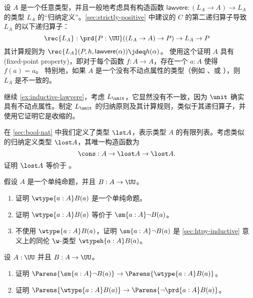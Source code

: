 \begin{ex}\label{ex:inductive-lawvere}
设 $A$ 是一个任意类型，并且一般地考虑具有构造函数 $\mathsf{lawvere}:(L_A\to A) \to L_A$ 的类型 $L_A$ 的“归纳定义”。\cref{sec:strictly-positive} 中建议的 $C$ 的第二递归算子导致 $L_A$ 的以下递归算子：
\[ \rec{L_A} : \prd{P:\UU} ((L_A\to A) \to P) \to L_A\to P \]
其计算规则为 $\rec{L_A}(P,h,\mathsf{lawvere}(\alpha)) \jdeq h(\alpha)$。
使用这个证明 $A$ 具有 (fixed-point property)，即对于每个函数 $f:A\to A$，存在一个 $a:A$ 使得 $f(a)=a$。
%
%
特别地，如果 $A$ 是一个没有不动点属性的类型（例如 \emptyt、\bool 或 \nat），则 $L_A$ 是不一致的。
\end{ex}

\begin{ex}\label{ex:ilunit}
继续 \cref{ex:inductive-lawvere}，考虑 $L_\unit$，它显然没有不一致，因为 $\unit$ 确实具有不动点属性。制定 $L_\unit$ 的归纳原则及其计算规则，类似于其递归算子，并使用它证明它是收缩的。
\end{ex}

\begin{ex}\label{ex:empty-inductive-type}
在 \cref{sec:bool-nat} 中我们定义了类型 $\lst A$，表示类型 $A$ 的有限列表。考虑类似的归纳定义类型 $\lost A$，其唯一构造函数为
\[ \cons: A \to \lost A \to \lost A. \]
证明 $\lost A$ 等价于 \emptyt。
\end{ex}

\begin{ex}\label{ex:Wprop}
假设 $A$ 是一个单纯命题，并且 $B:A\to \UU$。
\begin{enumerate}
    \item 证明 $\wtype{a:A} B(a)$ 是一个单纯命题。
    \item 证明 $\wtype{a:A} B(a)$ 等价于 $\sm{a:A} \neg B(a)$。
    \item 不使用 $\wtype{a:A} B(a)$，证明 $\sm{a:A} \neg B(a)$ 是 \cref{sec:htpy-inductive} 意义上的同伦 $\w$-类型 $\wtypeh{a:A} B(a)$。
\end{enumerate}
\end{ex}

\begin{ex}\label{ex:Wbounds}
设 $A:\UU$ 并且 $B:A\to \UU$。
\begin{enumerate}
    \item 证明 $\Parens{\sm{a:A} \neg B(a)} \to \Parens{\wtype{a:A} B(a)}$。
    \item 证明 $\Parens{\wtype{a:A} B(a)} \to \Parens{\neg \prd{a:A} B(a)}$。
\end{enumerate}
\end{ex}

